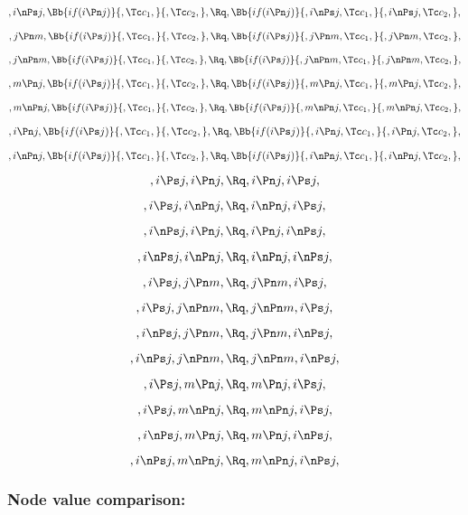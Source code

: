 \bigskip
\bigskip
\[, i \nPs j,\Bb{if(i \Pn j)}{,\Tc c_1,}{,\Tc c_2,}, \Rq , \Bb{if(i \Pn j)}{,i \nPs j, \Tc c_1,}{,i \nPs j, \Tc c_2,},\]

\bigskip
\bigskip
\[, j \Pn m,\Bb{if(i \Ps j)}{,\Tc c_1,}{,\Tc c_2,}, \Rq , \Bb{if(i \Ps j)}{,j \Pn m, \Tc c_1,}{,j \Pn m, \Tc c_2,},\]

\bigskip
\bigskip
\[, j \nPn m,\Bb{if(i \Ps j)}{,\Tc c_1,}{,\Tc c_2,}, \Rq , \Bb{if(i \Ps j)}{,j \nPn m, \Tc c_1,}{,j \nPn m, \Tc c_2,},\]

\bigskip
\bigskip
\[, m \Pn j,\Bb{if(i \Ps j)}{,\Tc c_1,}{,\Tc c_2,}, \Rq , \Bb{if(i \Ps j)}{,m \Pn j, \Tc c_1,}{,m \Pn j, \Tc c_2,},\]

\bigskip
\bigskip
\[, m \nPn j,\Bb{if(i \Ps j)}{,\Tc c_1,}{,\Tc c_2,}, \Rq , \Bb{if(i \Ps j)}{,m \nPn j, \Tc c_1,}{,m \nPn j, \Tc c_2,},\]

\bigskip
\bigskip
\[, i \Pn j,\Bb{if(i \Ps j)}{,\Tc c_1,}{,\Tc c_2,}, \Rq , \Bb{if(i \Ps j)}{,i \Pn j, \Tc c_1,}{,i \Pn j, \Tc c_2,},\]

\bigskip
\bigskip
\[, i \nPn j,\Bb{if(i \Ps j)}{,\Tc c_1,}{,\Tc c_2,}, \Rq , \Bb{if(i \Ps j)}{,i \nPn j, \Tc c_1,}{,i \nPn j, \Tc c_2,},\]

\bigskip
\bigskip


\[,i \Ps j, i \Pn j, \Rq , i \Pn j, i \Ps j,\]

\[,i \Ps j, i \nPn j, \Rq , i \nPn j, i \Ps j,\]

\[,i \nPs j, i \Pn j, \Rq , i \Pn j, i \nPs j,\]

\[,i \nPs j, i \nPn j, \Rq , i \nPn j, i \nPs j,\]

\[,i \Ps j, j \Pn m, \Rq , j \Pn m, i \Ps j,\]

\[,i \Ps j, j \nPn m, \Rq , j \nPn m, i \Ps j,\]

\[,i \nPs j, j \Pn m, \Rq , j \Pn m, i \nPs j,\]

\[,i \nPs j, j \nPn m, \Rq , j \nPn m, i \nPs j,\]



\[,i \Ps j, m \Pn j, \Rq , m \Pn j, i \Ps j,\]

\[,i \Ps j, m \nPn j, \Rq , m \nPn j, i \Ps j,\]

\[,i \nPs j, m \Pn j, \Rq , m \Pn j, i \nPs j,\]

\[,i \nPs j, m \nPn j, \Rq , m \nPn j, i \nPs j,\]




\bigskip
\bigskip
\bigskip
\bigskip
\subsubsection{Node value comparison:} 


